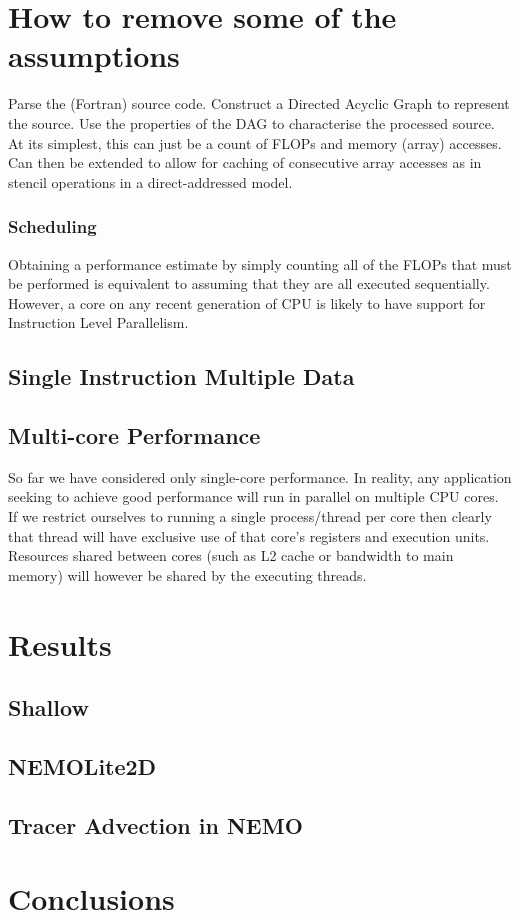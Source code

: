 \documentclass[12pt]{article}
\begin{document}
\section{How to remove some of the assumptions}

Parse the (Fortran) source code.  Construct a Directed Acyclic Graph
to represent the source.  Use the properties of the DAG to
characterise the processed source.  At its simplest, this can just be
a count of FLOPs and memory (array) accesses.  Can then be extended to
allow for caching of consecutive array accesses as in stencil
operations in a direct-addressed model.

\subsubsection{Scheduling}

Obtaining a performance estimate by simply counting all of the FLOPs
that must be performed is equivalent to assuming that they are all
executed sequentially. However, a core on any recent generation of CPU
is likely to have support for Instruction Level Parallelism.

\subsection{Single Instruction Multiple Data}

\subsection{Multi-core Performance}

So far we have considered only single-core performance. In reality,
any application seeking to achieve good performance will run in
parallel on multiple CPU cores.  If we restrict ourselves to running a
single process/thread per core then clearly that thread will have
exclusive use of that core's registers and execution units. Resources
shared between cores (such as L2 cache or bandwidth to main memory) will
however be shared by the executing threads.

\section{Results}

\subsection{Shallow}

\subsection{NEMOLite2D}

\subsection{Tracer Advection in NEMO}

\section{Conclusions}



\end{document}
